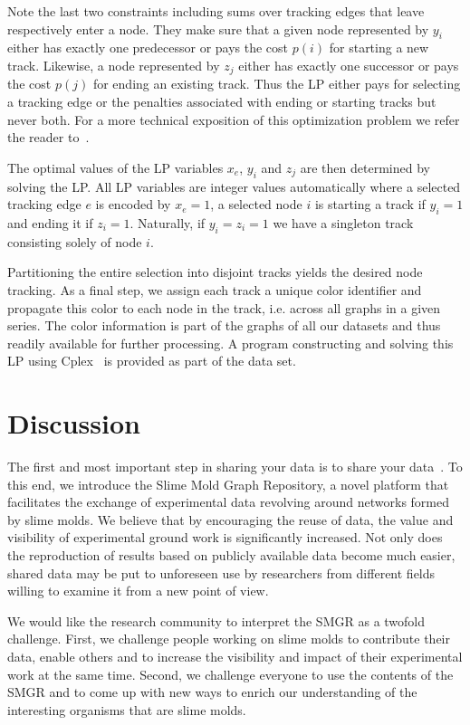 	      Note the last two constraints including sums over tracking edges that leave respectively enter a node. They make sure that a given node represented by $y_i$ either has exactly one predecessor or pays the cost $p(i)$ for starting a new track. Likewise, a node represented by $z_j$ either has exactly one successor or pays the cost $p(j)$ for ending an existing track. Thus the LP either pays for selecting a tracking edge or the penalties associated with ending or starting tracks but never both. For a more technical exposition of this optimization problem we refer the reader to~\cite{Karrenbauer2013}.

	      The optimal values of the LP variables $x_e$, $y_i$ and $z_j$ are then determined by solving the LP. All LP variables are integer values automatically where a selected tracking edge $e$ is encoded by $x_e=1$, a selected node $i$ is starting a track if $y_i=1$ and ending it if $z_i=1$. Naturally, if $y_i=z_i=1$ we have a singleton track consisting solely of node $i$.

	      Partitioning the entire selection into disjoint tracks yields the desired node tracking. As a final step, we assign each track a unique color identifier and propagate this color to each node in the track, i.e. across all graphs in a given series. The color information is part of the graphs of all our datasets and thus readily available for further processing. A program constructing and solving this LP using Cplex~\cite{cplex2005high} is provided as part of the data set.

\section{Discussion}

	The first and most important step in sharing your data is to share your data~\cite{white2013nine}. To this end, we introduce the Slime Mold Graph Repository, a novel platform that facilitates the exchange of experimental data revolving around networks formed by slime molds. We believe that by encouraging the reuse of data, the value and visibility of experimental ground work is significantly increased. Not only does the reproduction of results based on publicly available data become much easier, shared data may be put to unforeseen use by researchers from different fields willing to examine it from a new point of view. 

	We would like the research community to interpret the SMGR as a twofold challenge. First, we challenge people working on slime molds to contribute their data, enable others and to increase the visibility and impact of their experimental work at the same time. Second, we challenge everyone to use the contents of the SMGR and to come up with new ways to enrich our understanding of the interesting organisms that are slime molds.

